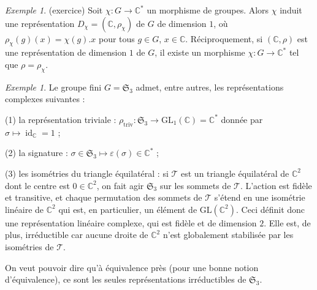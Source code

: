 \documentclass[a4paper]{article}
\theoremstyle{definition} %
\theoremstyle{plain} %
\theoremstyle{remark} %
\newtheorem{Ex}[Def]{Exemple} %
\newcommand{\C}{\mathbb{C}}
\begin{document}
\begin{Ex}\label{exReprésentations_de_dimension_1}(exercice)
Soit $\chi:G\rightarrow \C^*$ un morphisme de groupes. Alors $\chi$ induit une représentation $D_\chi=(\C,\rho_\chi)$ de $G$ de dimension $1$, où $\rho_\chi(g)(x)=\chi(g).x$ pour tous $g\in G$, $x\in \C$. Réciproquement, si $(\C,\rho)$ est une représentation de dimension $1$ de $G$, il existe un morphisme $\chi:G\rightarrow \C^*$ tel que $\rho=\rho_\chi$.
\end{Ex}

\begin{Ex}
Le groupe fini $G = \mathfrak{S}_3$ admet, entre autres, les représentations complexes suivantes :

(1) la représentation triviale : $\rho_{\mathrm{triv}} : \mathfrak{S}_3 \to \mathrm{GL}_1(\mathbb{C}) = \mathbb{C}^*$ donnée par $\sigma \mapsto \operatorname{id}_{\mathbb{C}} = 1$ ;

(2) la signature : $\sigma \in \mathfrak{S}_3 \mapsto \varepsilon(\sigma) \in \mathbb{C}^*$ ;

(3) les isométries du triangle équilatéral : si $\mathcal{T}$ est un triangle équilatéral de $\mathbb{C}^2$ dont le centre est $0 \in \mathbb{C}^2$, on fait agir $\mathfrak{S}_3$ sur les sommets de $\mathcal{T}$. L'action est fidèle et transitive, et chaque permutation des sommets de $\mathcal{T}$ s'étend en une isométrie linéaire de $\mathbb{C}^2$ qui est, en particulier, un élément de $\mathrm{GL}(\mathbb{C}^2)$.
Ceci définit donc une représentation linéaire complexe, qui est fidèle et de dimension $2$. Elle est, de plus, irréductible car aucune droite de $\mathbb{C}^2$ n'est globalement stabilisée par les isométries de $\mathcal{T}$.

On veut pouvoir dire qu'à équivalence près (pour une bonne notion d'équivalence), ce sont les seules représentations irréductibles de $\mathfrak{S}_3$.
\end{Ex}
\end{document}
